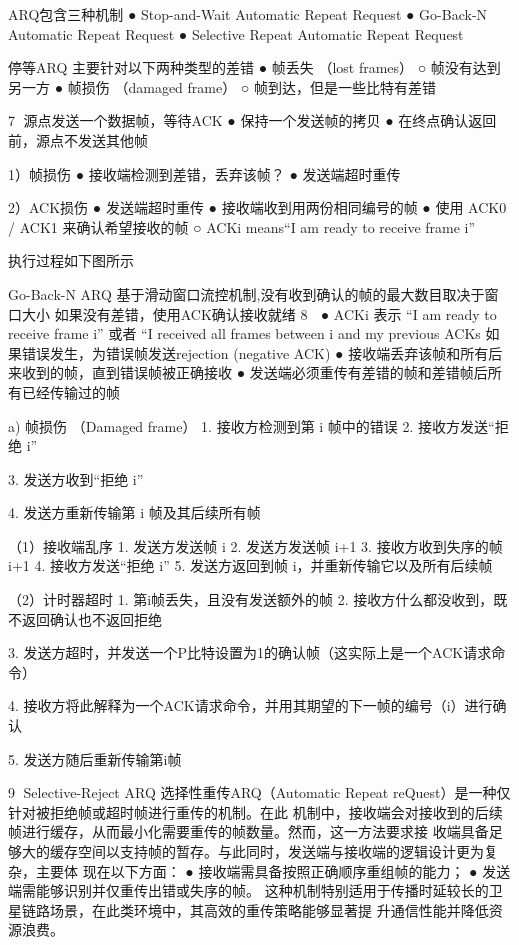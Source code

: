 ARQ包含三种机制
 ● Stop-and-Wait Automatic Repeat Request
 ● Go-Back-N        Automatic Repeat Request
 ● Selective Repeat Automatic Repeat Request


停等ARQ
主要针对以下两种类型的差错
 ● 帧丢失 （lost frames）
    ○ 帧没有达到另一方
 ● 帧损伤 （damaged frame）
    ○ 帧到达，但是一些比特有差错



                                                      7
源点发送一个数据帧，等待ACK
 ● 保持一个发送帧的拷贝
 ● 在终点确认返回前，源点不发送其他帧

1）帧损伤
 ● 接收端检测到差错，丢弃该帧？
 ● 发送端超时重传

2）ACK损伤
 ● 发送端超时重传
 ● 接收端收到用两份相同编号的帧
 ● 使用 ACK0 / ACK1 来确认希望接收的帧
    ○ ACKi means“I am ready to receive frame i”

执行过程如下图所示




Go-Back-N ARQ
基于滑动窗口流控机制,没有收到确认的帧的最大数目取决于窗口大小
如果没有差错，使用ACK确认接收就绪
                                                  8
 ● ACKi 表示 “I am ready to receive frame i” 或者 “I received all frames between i and my
   previous ACKs
如果错误发生，为错误帧发送rejection (negative ACK)
 ● 接收端丢弃该帧和所有后来收到的帧，直到错误帧被正确接收
 ● 发送端必须重传有差错的帧和差错帧后所有已经传输过的帧



a) 帧损伤 （Damaged frame）
 1. 接收方检测到第 i 帧中的错误
 2. 接收方发送“拒绝 i”

 3. 发送方收到“拒绝 i”

 4. 发送方重新传输第 i 帧及其后续所有帧



（1）接收端乱序
 1. 发送方发送帧 i
 2. 发送方发送帧 i+1
 3. 接收方收到失序的帧 i+1
 4. 接收方发送“拒绝 i”
 5. 发送方返回到帧 i，并重新传输它以及所有后续帧



（2）计时器超时
 1. 第i帧丢失，且没有发送额外的帧
 2. 接收方什么都没收到，既不返回确认也不返回拒绝

 3. 发送方超时，并发送一个P比特设置为1的确认帧（这实际上是一个ACK请求命令）

 4. 接收方将此解释为一个ACK请求命令，并用其期望的下一帧的编号（i）进行确认

 5. 发送方随后重新传输第i帧




                                                                                    9
Selective-Reject ARQ
选择性重传ARQ（Automatic Repeat reQuest）是一种仅针对被拒绝帧或超时帧进行重传的机制。在此
机制中，接收端会对接收到的后续帧进行缓存，从而最小化需要重传的帧数量。然而，这一方法要求接
收端具备足够大的缓存空间以支持帧的暂存。与此同时，发送端与接收端的逻辑设计更为复杂，主要体
现在以下方面：
 ● 接收端需具备按照正确顺序重组帧的能力；
 ● 发送端需能够识别并仅重传出错或失序的帧。
   这种机制特别适用于传播时延较长的卫星链路场景，在此类环境中，其高效的重传策略能够显著提
   升通信性能并降低资源浪费。





